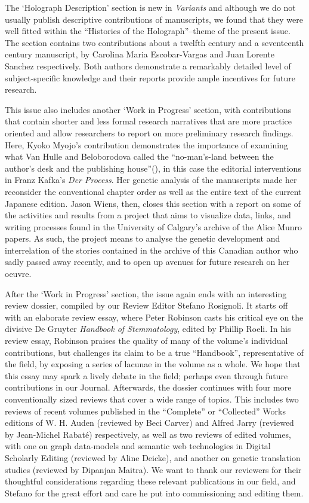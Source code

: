 The `Holograph Description' section is new in \emph{Variants} and although we do not usually publish descriptive contributions of manuscripts, we found that they were well fitted within the ``Histories of the Holograph''--theme of the present issue. The section contains two contributions about a twelfth century and a seventeenth century manuscript, by Carolina Maria Escobar-Vargas and Juan Lorente Sanchez respectively. Both authors demonstrate a remarkably detailed level of subject-specific knowledge and their reports provide ample incentives for future research. 

This issue also includes another `Work in Progress' section, with contributions that contain shorter and less formal research narratives that are more practice oriented and allow researchers to report on more preliminary research findings. Here, Kyoko Myojo's contribution demonstrates the importance of examining what Van Hulle and Beloborodova called the ``no-man's-land between the author's desk and the publishing house''(\pageref{qtVanhulle2}), in this case the editorial interventions in Franz Kafka's \emph{Der Process}. Her genetic analysis of the manuscripts made her reconsider the conventional chapter order as well as the entire text of the current Japanese edition. Jason Wiens, then, closes this section with a report on some of the activities and results from a project that aims to visualize data, links, and writing processes found in the University of Calgary's archive of the Alice Munro papers. As such, the project means to analyse the genetic development and interrelation of the stories contained in the archive of this Canadian author who sadly passed away recently, and to open up avenues for future research on her oeuvre.

After the `Work in Progress' section, the issue again ends with an interesting review dossier, compiled by our Review Editor Stefano Rosignoli. It starts off with an elaborate review essay, where Peter Robinson casts his critical eye on the divisive De Gruyter \emph{Handbook of Stemmatology}, edited by Phillip Roeli. In his review essay, Robinson praises the quality of many of the volume's individual contributions, but challenges its claim to be a true ``Handbook'', representative of the field, by exposing a series of lacunae in the volume as a whole. We hope that this essay may spark a lively debate in the field; perhaps even through future contributions in our Journal. Afterwards, the dossier continues with four more conventionally sized reviews that cover a wide range of topics. This includes two reviews of recent volumes published in the ``Complete'' or ``Collected'' Works editions of W. H. Auden (reviewed by Beci Carver) and Alfred Jarry (reviewed by Jean-Michel Rabaté) respectively, as well as two reviews of edited volumes, with one on graph data-models and semantic web technologies in Digital Scholarly Editing (reviewed by Aline Deicke), and another on genetic translation studies (reviewed by Dipanjan Maitra). We want to thank our reviewers for their thoughtful considerations regarding these relevant publications in our field, and Stefano for the great effort and care he put into commissioning and  editing them.


